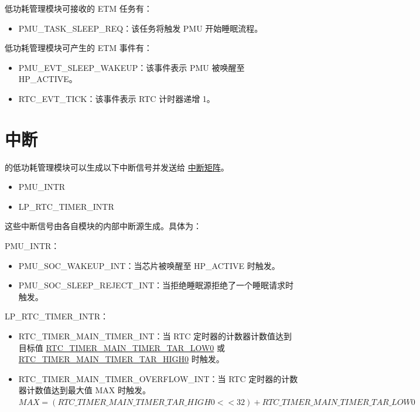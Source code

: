 \documentclass[main\_\_CN.tex]{subfiles}
\begin{document}
低功耗管理模块可接收的 ETM 任务有：

\begin{itemize}
\item PMU\_TASK\_SLEEP\_REQ：该任务将触发 PMU 开始睡眠流程。
\end{itemize}

低功耗管理模块可产生的 ETM 事件有：

\begin{itemize}
\item PMU\_EVT\_SLEEP\_WAKEUP：该事件表示 PMU 被唤醒至 HP\_ACTIVE。
\item RTC\_EVT\_TICK：该事件表示 RTC 计时器递增 1。
\end{itemize}



\section{中断}

\chipname{} 的低功耗管理模块可以生成以下中断信号并发送给 \hyperref[mod:intmtrx]{中断矩阵}。

\begin{itemize}
    \item PMU\_INTR
    \item LP\_RTC\_TIMER\_INTR
\end{itemize}

这些中断信号由各自模块的内部中断源生成。具体为：

PMU\_INTR：

\begin{itemize}
\item \label{int:PMUSOCWAKEUPINT}PMU\_SOC\_WAKEUP\_INT：当芯片被唤醒至 HP\_ACTIVE 时触发。

\item \label{int:PMUSOCSLEEPREJECTINT}PMU\_SOC\_SLEEP\_REJECT\_INT：当拒绝睡眠源拒绝了一个睡眠请求时触发。

\end{itemize}

LP\_RTC\_TIMER\_INTR：
\begin{itemize}
\item \label{int:RTCTIMERMAINTIMERINT}RTC\_TIMER\_MAIN\_TIMER\_INT：当 RTC 定时器的计数器计数值达到目标值 \hyperref[fielddesc:RTCTIMERMAINTIMERTARLOW0]{RTC\_TIMER\_MAIN\_TIMER\_TAR\_LOW0} 或 \hyperref[fielddesc:RTCTIMERMAINTIMERTARHIGH0]{RTC\_TIMER\_MAIN\_TIMER\_TAR\_HIGH0} 时触发。
\item \label{int:RTCTIMERMAINTIMEROVERFLOWINT}RTC\_TIMER\_MAIN\_TIMER\_OVERFLOW\_INT：当 RTC 定时器的计数器计数值达到最大值 MAX 时触发。\\
$MAX = (\hyperref[fielddesc:RTCTIMERMAINTIMERTARHIGH0]{RTC\_TIMER\_MAIN\_TIMER\_TAR\_HIGH0} << 32) + \hyperref[fielddesc:RTCTIMERMAINTIMERTARLOW0]{RTC\_TIMER\_MAIN\_TIMER\_TAR\_LOW0}$

\end{itemize}
\end{document}
